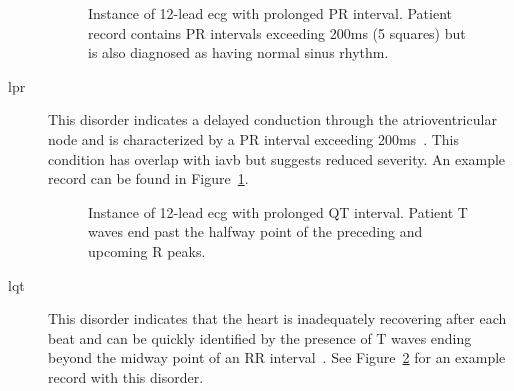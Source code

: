 \documentclass[\main/thesis.tex]{subfiles}
\begin{document}
\begin{description}
    \begin{figure}[ht]
        \centering
        \caption{Instance of 12-lead \gls{ecg} with prolonged PR interval. Patient record contains PR intervals exceeding 200ms (5 squares) but is also diagnosed as having normal sinus rhythm.}
        \label{fig:full_LPR}
    \end{figure}
    \item[\gls{lpr}] This disorder indicates a delayed conduction through the atrioventricular node and is characterized by a PR interval exceeding 200ms~\cite{Kwok672}. This condition has overlap with \gls{iavb} but suggests reduced severity.
    An example record can be found in Figure~\ref{fig:full_LPR}.

    \begin{figure}[ht]
        \centering
        \caption{Instance of 12-lead \gls{ecg} with prolonged QT interval. Patient T waves end past the halfway point of the preceding and upcoming R peaks.}
        \label{fig:full_LQT}
    \end{figure}
    \item[\gls{lqt}] This disorder indicates that the heart is inadequately recovering after each beat and can be quickly identified by the presence of T waves ending beyond the midway point of an RR interval~\cite{10.1001/jama.1986.03380210081029}.
    See Figure~\ref{fig:full_LQT} for an example record with this disorder.


\end{description}
\end{document}
